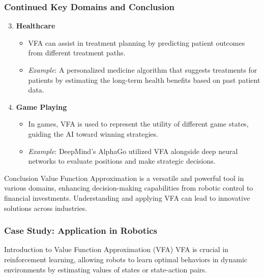 \documentclass[aspectratio=169]{beamer}
\begin{document}
\begin{frame}[fragile]
    \frametitle{Continued Key Domains and Conclusion}
    \begin{enumerate}
        \setcounter{enumi}{2}
        \item \textbf{Healthcare}
            \begin{itemize}
                \item VFA can assist in treatment planning by predicting patient outcomes from different treatment paths.
                \item \textit{Example}: A personalized medicine algorithm that suggests treatments for patients by estimating the long-term health benefits based on past patient data.
            \end{itemize}
        \item \textbf{Game Playing}
            \begin{itemize}
                \item In games, VFA is used to represent the utility of different game states, guiding the AI toward winning strategies.
                \item \textit{Example}: DeepMind's AlphaGo utilized VFA alongside deep neural networks to evaluate positions and make strategic decisions.
            \end{itemize}
    \end{enumerate}
    \begin{block}{Conclusion}
        Value Function Approximation is a versatile and powerful tool in various domains, enhancing decision-making capabilities from robotic control to financial investments. 
        Understanding and applying VFA can lead to innovative solutions across industries.
    \end{block}
\end{frame}

\begin{frame}[fragile]
    \frametitle{Case Study: Application in Robotics}
    \begin{block}{Introduction to Value Function Approximation (VFA)}
        VFA is crucial in reinforcement learning, allowing robots to learn optimal behaviors in dynamic environments by estimating values of states or state-action pairs.
    \end{block}
\end{frame}
\end{document}
